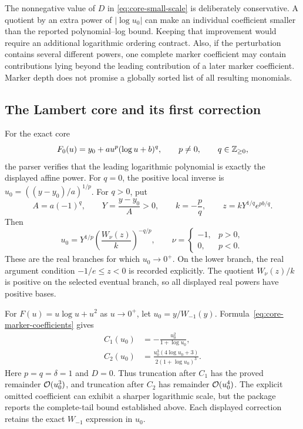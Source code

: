 The nonnegative value of $D$ in \eqref{eq:core-small-scale} is deliberately
conservative. A quotient by an extra power of $|\log u_0|$ can make an
individual coefficient smaller than the reported polynomial--log bound.
Keeping that improvement would require an additional logarithmic ordering
contract. Also, if the perturbation contains several different powers,
one complete marker coefficient may contain contributions lying beyond
the leading contribution of a later marker coefficient. Marker depth does
not promise a globally sorted list of all resulting monomials.

\subsection{The Lambert core and its first correction}

For the exact core
\[
 F_0(u)=y_0+a u^p(\log u+b)^q,\qquad p\ne0,
 \qquad q\in\mathbb Z_{\ge0},
\]
the parser verifies that the leading logarithmic polynomial is exactly the
displayed affine power. For $q=0$, the positive local inverse is
$u_0=((y-y_0)/a)^{1/p}$. For $q>0$, put
\[
 A=a(-1)^q,\qquad Y=\frac{y-y_0}{A}>0,\qquad
 k=-\frac pq,\qquad z=kY^{1/q}e^{pb/q}.
\]
Then
\begin{equation}
 u_0=Y^{1/p}\left(\frac{W_\nu(z)}{k}\right)^{-q/p},
 \qquad
 \nu=\begin{cases}-1,&p>0,\\0,&p<0.\end{cases}
 \label{eq:core-exact-lambert-inverse}
\end{equation}
These are the real branches for which $u_0\to0^+$. On the lower branch,
the real argument condition $-1/e\le z<0$ is recorded explicitly. The
quotient $W_\nu(z)/k$ is positive on the selected eventual branch, so all
displayed real powers have positive bases.

\begin{example}
\label{ex:core-lambert-quadratic-perturbation}
For $F(u)=u\log u+u^2$ as $u\to0^+$, let
$u_0=y/W_{-1}(y)$. Formula~\eqref{eq:core-marker-coefficients} gives
\begin{align}
 C_1(u_0)&=-\frac{u_0^2}{1+\log u_0},\label{eq:core-lambert-first-correction}\\
 C_2(u_0)&=\frac{u_0^3(4\log u_0+3)}{2(1+\log u_0)^3}.
 \label{eq:core-lambert-second-correction}
\end{align}
Here $p=q=\delta=1$ and $D=0$. Thus truncation after $C_1$ has the
proved remainder $\mathcal O(u_0^3)$, and truncation after $C_2$ has remainder
$\mathcal O(u_0^4)$. The explicit omitted coefficient can exhibit a sharper
logarithmic scale, but the package reports the complete-tail bound
established above. Each displayed correction retains the exact
$W_{-1}$ expression in $u_0$.
\end{example}

